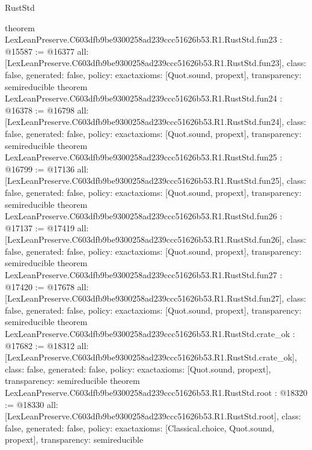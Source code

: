 \begin{lexlean}{RustStd}
\begin{coremodule}
{}
theorem LexLeanPreserve.C603dfb9be9300258ad239ccc51626b53.R1.RustStd.fun23 : @15587 := @16377 {
  all: [LexLeanPreserve.C603dfb9be9300258ad239ccc51626b53.R1.RustStd.fun23],
  class: false,
  generated: false,
  policy: exact{axioms: [Quot.sound, propext]},
  transparency: semireducible
}
theorem LexLeanPreserve.C603dfb9be9300258ad239ccc51626b53.R1.RustStd.fun24 : @16378 := @16798 {
  all: [LexLeanPreserve.C603dfb9be9300258ad239ccc51626b53.R1.RustStd.fun24],
  class: false,
  generated: false,
  policy: exact{axioms: [Quot.sound, propext]},
  transparency: semireducible
}
theorem LexLeanPreserve.C603dfb9be9300258ad239ccc51626b53.R1.RustStd.fun25 : @16799 := @17136 {
  all: [LexLeanPreserve.C603dfb9be9300258ad239ccc51626b53.R1.RustStd.fun25],
  class: false,
  generated: false,
  policy: exact{axioms: [Quot.sound, propext]},
  transparency: semireducible
}
theorem LexLeanPreserve.C603dfb9be9300258ad239ccc51626b53.R1.RustStd.fun26 : @17137 := @17419 {
  all: [LexLeanPreserve.C603dfb9be9300258ad239ccc51626b53.R1.RustStd.fun26],
  class: false,
  generated: false,
  policy: exact{axioms: [Quot.sound, propext]},
  transparency: semireducible
}
theorem LexLeanPreserve.C603dfb9be9300258ad239ccc51626b53.R1.RustStd.fun27 : @17420 := @17678 {
  all: [LexLeanPreserve.C603dfb9be9300258ad239ccc51626b53.R1.RustStd.fun27],
  class: false,
  generated: false,
  policy: exact{axioms: [Quot.sound, propext]},
  transparency: semireducible
}
theorem LexLeanPreserve.C603dfb9be9300258ad239ccc51626b53.R1.RustStd.crate_ok : @17682 := @18312 {
  all: [LexLeanPreserve.C603dfb9be9300258ad239ccc51626b53.R1.RustStd.crate_ok],
  class: false,
  generated: false,
  policy: exact{axioms: [Quot.sound, propext]},
  transparency: semireducible
}
theorem LexLeanPreserve.C603dfb9be9300258ad239ccc51626b53.R1.RustStd.root : @18320 := @18330 {
  all: [LexLeanPreserve.C603dfb9be9300258ad239ccc51626b53.R1.RustStd.root],
  class: false,
  generated: false,
  policy: exact{axioms: [Classical.choice, Quot.sound, propext]},
  transparency: semireducible
}


\end{coremodule}
\end{lexlean}
